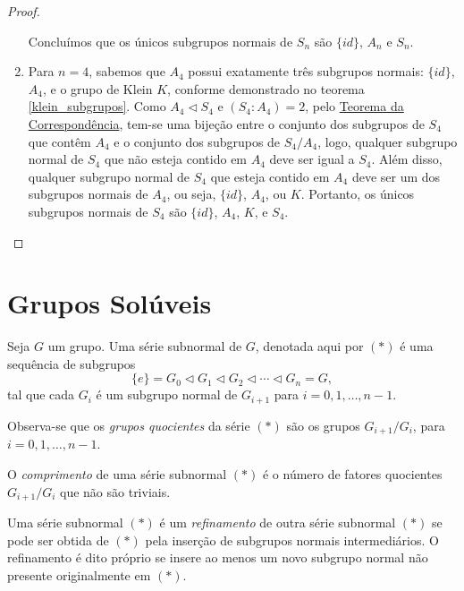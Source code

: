 \documentclass[11pt,openany]{book}
\begin{document}
\begin{proof}
\begin{enumerate}[label=\alph*)]
        Concluímos que os únicos subgrupos normais de $S_n$ são $\{id\}$, $A_n$ e $S_n$.

        \item Para $n = 4$, sabemos que $A_4$ possui exatamente três subgrupos normais: $\{id\}$, $A_4$, e o grupo de Klein $K$, conforme demonstrado no teorema \ref{klein_subgrupos}. Como $A_4 \triangleleft S_4$ e $(S_4:A_4) = 2$, pelo \hyperref[theo:teorema_da_correspondencia]{Teorema da Correspondência}, tem-se uma bijeção entre o conjunto dos subgrupos de $S_4$ que contêm $A_4$ e o conjunto dos subgrupos de $S_4/A_4$, logo, qualquer subgrupo normal de $S_4$ que não esteja contido em $A_4$ deve ser igual a $S_4$. Além disso, qualquer subgrupo normal de $S_4$ que esteja contido em $A_4$ deve ser um dos subgrupos normais de $A_4$, ou seja, $\{id\}$, $A_4$, ou $K$. Portanto, os únicos subgrupos normais de $S_4$ são $\{id\}$, $A_4$, $K$, e $S_4$.
    \end{enumerate}
\end{proof}

\chapter{Grupos Solúveis}

\begin{definition}
\label{def:serie_subnormal}
    Seja \(G\) um grupo. Uma série subnormal de \(G\), denotada aqui por $(*)$ é uma sequência de subgrupos
    \[
    \{e\} = G_0 \triangleleft G_1 \triangleleft G_2 \triangleleft \cdots \triangleleft G_n = G,
    \]
    tal que cada \(G_i\) é um subgrupo normal de \(G_{i+1}\) para \(i=0,1,\dots,n-1\).
\end{definition}

Observa-se que os \textit{grupos quocientes} da série $(*)$ são os grupos $G_{i+1}/G_i$, para \(i=0,1,\dots,n-1\). 

\begin{definition}
\label{def:comprimento_serie}
        O \textit{comprimento} de uma série subnormal $(*)$ é o número de fatores quocientes $G_{i+1}/G_i$ que não são triviais.
\end{definition}

\begin{definition}
\label{def:refinamento_serie}
        Uma série subnormal $(*)$ é um \textit{refinamento} de outra série subnormal $(*)$ se pode ser obtida de $(*)$ pela inserção de subgrupos normais intermediários. O refinamento é dito próprio se insere ao menos um novo subgrupo normal não presente originalmente em $(*)$.
\end{definition}
\end{document}
